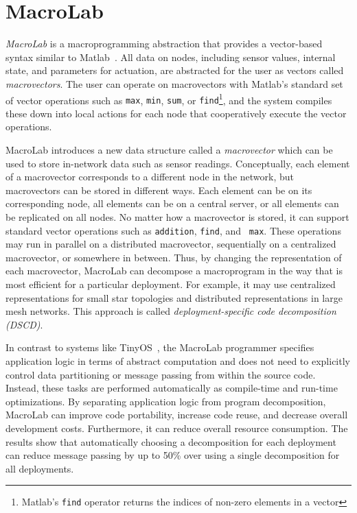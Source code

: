 \chapter{MacroLab}
\label{sect:macrolab}

\emph{MacroLab} is a macroprogramming abstraction that provides a vector-based
syntax similar to Matlab~\cite{matlab}.  All data on nodes, including sensor
values, internal state, and parameters for actuation, are abstracted for the
user as vectors called \emph{macrovectors}.  The user can operate on
macrovectors with Matlab's standard set of vector operations such as {\tt max},
{\tt min}, {\tt sum}, or {\tt find}\footnote{Matlab's {\tt find} operator
returns the indices of non-zero elements in a vector}, and the system compiles
these down into local actions for each node that cooperatively execute the
vector operations.

MacroLab introduces a new data structure called a {\em macrovector} which can be
used to store in-network data such as sensor readings. Conceptually, each
element of a macrovector corresponds to a different node in the network, but
macrovectors can be stored in different ways. Each element can be on its
corresponding node, all elements can be on a central server, or all elements can
be replicated on all nodes.  No matter how a macrovector is stored, it can
support standard vector operations such as {\tt addition}, {\tt find}, and {\tt
max}.  These operations may run in parallel on a distributed macrovector,
sequentially on a centralized macrovector, or somewhere in between.  Thus, by
changing the representation of each macrovector, MacroLab can decompose a
macroprogram in the way that is most efficient for a particular deployment.  For
example, it may use centralized representations for small star topologies and
distributed representations in large mesh networks. This approach is called {\em
deployment-specific code decomposition (DSCD)}.

In contrast to systems like TinyOS~\cite{Levis}, the MacroLab programmer
specifies application logic in terms of abstract computation and does not need
to explicitly control data partitioning or message passing from within the
source code.  Instead, these tasks are performed automatically as compile-time
and run-time optimizations.  By separating application logic from program
decomposition, MacroLab can improve code portability, increase code reuse, and
decrease overall development costs.  Furthermore, it can reduce overall resource
consumption. The results show that automatically choosing a decomposition for
each deployment can reduce message passing by up to 50\% over using a single
decomposition for all deployments.

